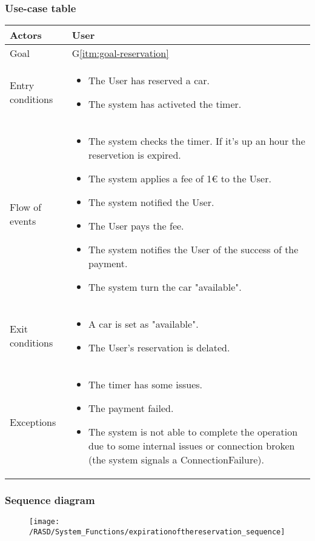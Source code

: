 \subsubsection{Use-case table}
\begin{center}
  \begin{tabular}{ l | p{10cm} }
    \hline
    Actors & User\\ \hline
    Goal & G\ref{itm:goal-reservation}\\ \hline
    Entry conditions & \begin{itemize}
			\item The User has reserved a car.
			\item The system has activeted the timer.
\end{itemize}  \\ \hline
    Flow of events &
\begin{itemize}
\item The system checks the timer. If it's up an hour the reservetion is expired.
\item The system applies a fee of 1€ to the User.
\item The system notified the User.
\item The User pays the fee.
\item The system notifies the User of the success of the payment.
\item The system turn the car "available".
\end{itemize} \\ \hline
    Exit conditions &
\begin{itemize}
	\item A car is set as "available".
	\item The User's reservation is delated.
\end{itemize}  \\ \hline
  Exceptions & 
\begin{itemize}
\item The timer has some issues.
\item The payment failed.
\item The system is not able to complete the operation due to some internal issues or connection broken (the system signals a ConnectionFailure).%
\end{itemize} 
\\ \hline
  \end{tabular}
\end{center}


\newpage
\subsubsection{Sequence diagram}
\begin{figure}[!ht]
  \centering
  \vspace{0.2cm}
  \texttt{[image: /RASD/System\_Functions/expirationofthereservation\_sequence]}\\
  \vspace{0.1cm}
  \label{fig:expirationofthereservation_sequence} 
\end{figure}

